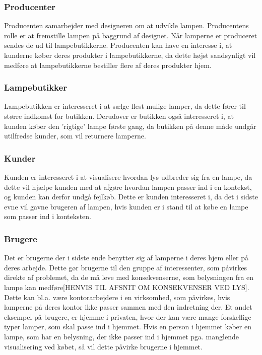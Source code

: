 \subsubsection{Producenter}
Producenten samarbejder med designeren om at udvikle lampen. Producentens rolle er at fremstille lampen på baggrund af designet. Når lamperne er produceret sendes de ud til lampebutikkerne. Producenten kan have en interesse i, at kunderne køber deres produkter i lampebutikkerne, da dette højst sandsynligt vil medføre at lampebutikkerne bestiller flere af deres produkter hjem. 

\subsubsection{Lampebutikker}
Lampebutikken er interesseret i at sælge flest mulige lamper, da dette fører til større indkomst for butikken. Derudover er butikken også interesseret i, at kunden køber den 'rigtige' lampe første gang, da butikken på denne måde undgår utilfredse kunder, som vil returnere lamperne.

\subsubsection{Kunder}
Kunden er interesseret i at visualisere hvordan lys udbreder sig fra en lampe, da dette vil hjælpe kunden med at afgøre hvordan lampen passer ind i en kontekst, og kunden kan derfor undgå fejlkøb. Dette er kunden interesseret i, da det i sidste evne vil gavne brugeren af lampen, hvis kunden er i stand til at købe en lampe som passer ind i konteksten.

\subsubsection{Brugere}
Det er brugerne der i sidste ende benytter sig af lamperne i deres hjem eller på deres arbejde. Dette gør brugerne til den gruppe af interessenter, som påvirkes direkte af problemet, da de må leve med konsekvenserne, som belysningen fra en lampe kan medføre[HENVIS TIL AFSNIT OM KONSEKVENSER VED LYS]. Dette kan bl.a. være kontorarbejdere i en virksomhed, som påvirkes, hvis lamperne på deres kontor ikke passer sammen med den indretning der. Et andet eksempel på brugere, er hjemme i privaten, hvor der kan være mange forskellige typer lamper, som skal passe ind i hjemmet. Hvis en person i hjemmet køber en lampe, som har en belysning, der ikke passer ind i hjemmet pga. manglende visualisering ved købet, så vil dette påvirke brugerne i hjemmet. 

